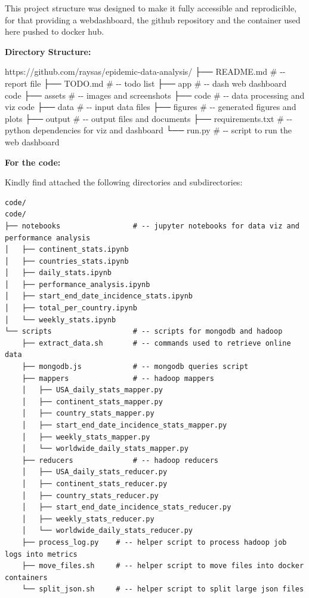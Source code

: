 \documentclass[
]{article}
\newenvironment{Shaded}{}{}
\newcommand{\NormalTok}[1]{#1}
\begin{document}
This project structure was designed to make it fully accessible and
reprodicible, for that providing a webdashboard, the github repository
and the container used here pushed to docker hub.

\textbf{Directory Structure:}

\begin{Shaded}
\begin{Highlighting}[]
\NormalTok{https://github.com/raysas/epidemic{-}data{-}analysis/}
\NormalTok{├── README.md           \# {-}{-} report file}
\NormalTok{├── TODO.md             \# {-}{-} todo list}
\NormalTok{├── app                 \# {-}{-} dash web dashboard code}
\NormalTok{├── assets              \# {-}{-} images and screenshots}
\NormalTok{├── code                \# {-}{-} data processing and viz code}
\NormalTok{├── data                \# {-}{-} input data files}
\NormalTok{├── figures             \# {-}{-} generated figures and plots}
\NormalTok{├── output              \# {-}{-} output files and documents}
\NormalTok{├── requirements.txt    \# {-}{-} python dependencies for viz and dashboard}
\NormalTok{└── run.py              \# {-}{-} script to run the web dashboard}
\end{Highlighting}
\end{Shaded}

\textbf{For the code:}

Kindly find attached the following directories and subdirectories:

\begin{verbatim}
code/
code/
├── notebooks                 # -- jupyter notebooks for data viz and performance analysis
│   ├── continent_stats.ipynb
│   ├── countries_stats.ipynb
│   ├── daily_stats.ipynb
│   ├── performance_analysis.ipynb
│   ├── start_end_date_incidence_stats.ipynb
│   ├── total_per_country.ipynb
│   └── weekly_stats.ipynb
└── scripts                   # -- scripts for mongodb and hadoop 
    ├── extract_data.sh       # -- commands used to retrieve online data
    ├── mongodb.js            # -- mongodb queries script
    ├── mappers               # -- hadoop mappers
    │   ├── USA_daily_stats_mapper.py
    │   ├── continent_stats_mapper.py
    │   ├── country_stats_mapper.py
    │   ├── start_end_date_incidence_stats_mapper.py
    │   ├── weekly_stats_mapper.py
    │   └── worldwide_daily_stats_mapper.py
    ├── reducers              # -- hadoop reducers 
    │   ├── USA_daily_stats_reducer.py
    │   ├── continent_stats_reducer.py
    │   ├── country_stats_reducer.py
    │   ├── start_end_date_incidence_stats_reducer.py
    │   ├── weekly_stats_reducer.py
    │   └── worldwide_daily_stats_reducer.py
    ├── process_log.py    # -- helper script to process hadoop job logs into metrics
    ├── move_files.sh     # -- helper script to move files into docker containers
    └── split_json.sh     # -- helper script to split large json files
\end{verbatim}
\end{document}
